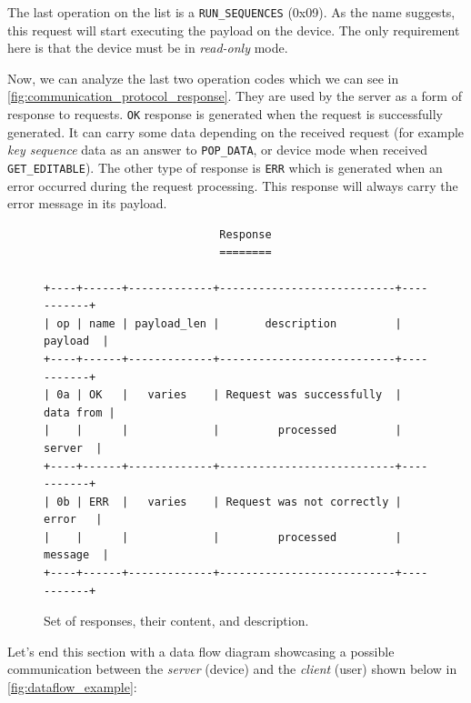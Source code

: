 The last operation on the list is a \verb|RUN_SEQUENCES| (0x09). As the name suggests, this request will start executing the payload on the device. The only requirement here is that the device must be in \emph{read-only} mode.

Now, we can analyze the last two operation codes which we can see in \autoref{fig:communication_protocol_response}. They are used by the server as a form of response to requests. \verb|OK| response is generated when the request is successfully generated. It can carry some data depending on the received request (for example \emph{key sequence} data as an answer to \verb|POP_DATA|, or device mode when received \verb|GET_EDITABLE|). The other type of response is \verb|ERR| which is generated when an error occurred during the request processing. This response will always carry the error message in its payload.

\begin{figure}[ht]
\centering
\begin{varwidth}{\linewidth}
\begin{verbatim}
                           Response
                           ========

+----+------+-------------+---------------------------+-----------+
| op | name | payload_len |       description         |  payload  |
+----+------+-------------+---------------------------+-----------+
| 0a | OK   |   varies    | Request was successfully  | data from |
|    |      |             |         processed         |   server  |
+----+------+-------------+---------------------------+-----------+
| 0b | ERR  |   varies    | Request was not correctly |   error   |
|    |      |             |         processed         |  message  |
+----+------+-------------+---------------------------+-----------+
\end{verbatim}
\end{varwidth}
\caption{Set of responses, their content, and description.}
\label{fig:communication_protocol_response}
\end{figure}

Let's end this section with a data flow diagram showcasing a possible communication between the \emph{server} (device) and the \emph{client} (user) shown below in \autoref{fig:dataflow_example}:

